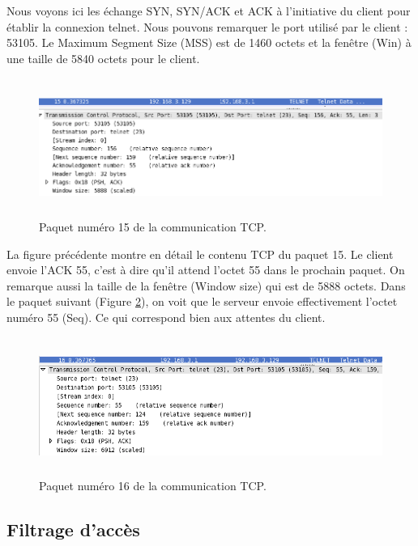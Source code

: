 \documentclass[12pt,a4paper,notitlepage]{article}
\begin{document}
Nous voyons ici les échange SYN, SYN/ACK et ACK à l'initiative du client pour établir la connexion telnet. Nous pouvons remarquer le port utilisé par le client : 53105.  Le Maximum Segment Size (MSS) est de 1460 octets et la fenêtre (Win) à une taille de 5840 octets pour le client.

\begin{figure}[!h]
\begin{center}
\includegraphics[height=4.5cm]{pck15.png}
\caption{Paquet numéro 15 de la communication TCP.}
\label{fig:di}
\end{center}
\end{figure}

La figure précédente montre en détail le contenu TCP du paquet 15. Le client envoie l'ACK 55, c'est à dire qu'il attend l'octet 55 dans le prochain paquet. On remarque aussi la taille de la fenêtre (\og Window size\fg) qui est de 5888 octets. Dans le paquet suivant (Figure \ref{fig:do}), on voit que le serveur envoie effectivement l'octet numéro 55 (Seq). Ce qui correspond bien aux attentes du client.

\begin{figure}[!h]
\begin{center}
\includegraphics[height=4.5cm]{pck16.png}
\caption{Paquet numéro 16 de la communication TCP.}
\label{fig:do}
\end{center}
\end{figure}

\subsection{Filtrage d'accès}
\end{document}
